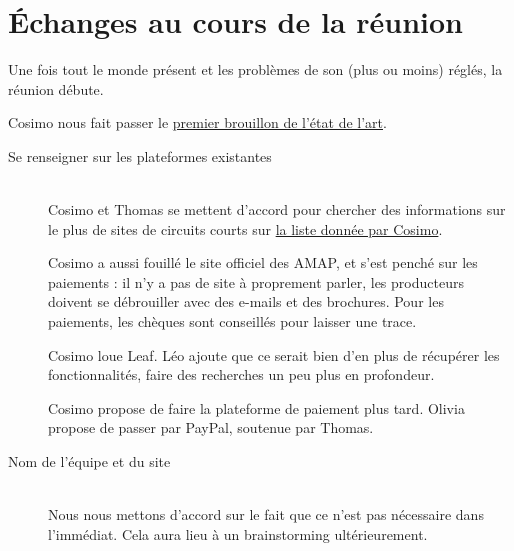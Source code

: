 \section{Échanges au cours de la réunion}


        Une fois tout le monde présent et les problèmes de son (plus ou moins) réglés, la réunion débute.

        Cosimo nous fait passer le \href{https://docs.google.com/document/d/1kN3yLbHacPv0A-VE_MOV0zmUfvvmW8FzXHhSFT4Q7lM/edit?usp=sharing}{premier brouillon de l’état de l’art}.

        \vskip 0.5cm
    
    \begin{description}

        \item [Se renseigner sur les plateformes existantes] \hfill\\
            Cosimo et Thomas se mettent d’accord pour chercher des informations sur le plus de sites de circuits courts sur \href{https://www.economie.gouv.fr/dgccrf/Publications/Vie-pratique/Fiches-pratiques/produits-alimentaires-commercialises-en-circuits-courts-0}{la liste donnée par Cosimo}.
            \par
            Cosimo a aussi fouillé le site officiel des AMAP, et s’est penché sur les paiements : il n’y a pas de site à proprement parler, les producteurs doivent se débrouiller avec des e-mails et des brochures. Pour les paiements, les chèques sont conseillés pour laisser une trace.
            \par
            Cosimo loue Leaf. Léo ajoute que ce serait bien d’en plus de récupérer les fonctionnalités, faire des recherches un peu plus en profondeur.
            \par
            Cosimo propose de faire la plateforme de paiement plus tard. Olivia propose de passer par PayPal, soutenue par Thomas.

            
        \vskip 0.5cm
        
        \item[Nom de l’équipe et du site] \hfill\\
            Nous nous mettons d’accord sur le fait que ce n’est pas nécessaire dans l’immédiat. Cela aura lieu à un brainstorming ultérieurement.

        \vskip 0.5cm
        

\end{description}
